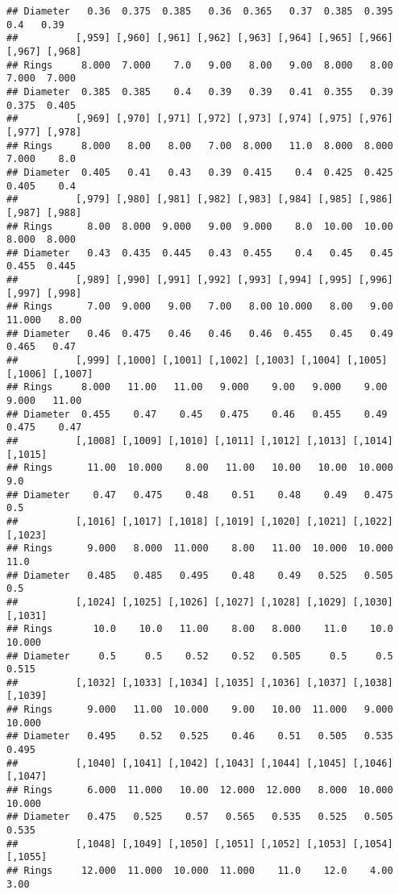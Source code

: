 \documentclass[
]{article}
\begin{document}
\begin{verbatim}
## Diameter   0.36  0.375  0.385   0.36  0.365   0.37  0.385  0.395    0.4   0.39
##          [,959] [,960] [,961] [,962] [,963] [,964] [,965] [,966] [,967] [,968]
## Rings     8.000  7.000    7.0   9.00   8.00   9.00  8.000   8.00  7.000  7.000
## Diameter  0.385  0.385    0.4   0.39   0.39   0.41  0.355   0.39  0.375  0.405
##          [,969] [,970] [,971] [,972] [,973] [,974] [,975] [,976] [,977] [,978]
## Rings     8.000   8.00   8.00   7.00  8.000   11.0  8.000  8.000  7.000    8.0
## Diameter  0.405   0.41   0.43   0.39  0.415    0.4  0.425  0.425  0.405    0.4
##          [,979] [,980] [,981] [,982] [,983] [,984] [,985] [,986] [,987] [,988]
## Rings      8.00  8.000  9.000   9.00  9.000    8.0  10.00  10.00  8.000  8.000
## Diameter   0.43  0.435  0.445   0.43  0.455    0.4   0.45   0.45  0.455  0.445
##          [,989] [,990] [,991] [,992] [,993] [,994] [,995] [,996] [,997] [,998]
## Rings      7.00  9.000   9.00   7.00   8.00 10.000   8.00   9.00 11.000   8.00
## Diameter   0.46  0.475   0.46   0.46   0.46  0.455   0.45   0.49  0.465   0.47
##          [,999] [,1000] [,1001] [,1002] [,1003] [,1004] [,1005] [,1006] [,1007]
## Rings     8.000   11.00   11.00   9.000    9.00   9.000    9.00   9.000   11.00
## Diameter  0.455    0.47    0.45   0.475    0.46   0.455    0.49   0.475    0.47
##          [,1008] [,1009] [,1010] [,1011] [,1012] [,1013] [,1014] [,1015]
## Rings      11.00  10.000    8.00   11.00   10.00   10.00  10.000     9.0
## Diameter    0.47   0.475    0.48    0.51    0.48    0.49   0.475     0.5
##          [,1016] [,1017] [,1018] [,1019] [,1020] [,1021] [,1022] [,1023]
## Rings      9.000   8.000  11.000    8.00   11.00  10.000  10.000    11.0
## Diameter   0.485   0.485   0.495    0.48    0.49   0.525   0.505     0.5
##          [,1024] [,1025] [,1026] [,1027] [,1028] [,1029] [,1030] [,1031]
## Rings       10.0    10.0   11.00    8.00   8.000    11.0    10.0  10.000
## Diameter     0.5     0.5    0.52    0.52   0.505     0.5     0.5   0.515
##          [,1032] [,1033] [,1034] [,1035] [,1036] [,1037] [,1038] [,1039]
## Rings      9.000   11.00  10.000    9.00   10.00  11.000   9.000  10.000
## Diameter   0.495    0.52   0.525    0.46    0.51   0.505   0.535   0.495
##          [,1040] [,1041] [,1042] [,1043] [,1044] [,1045] [,1046] [,1047]
## Rings      6.000  11.000   10.00  12.000  12.000   8.000  10.000  10.000
## Diameter   0.475   0.525    0.57   0.565   0.535   0.525   0.505   0.535
##          [,1048] [,1049] [,1050] [,1051] [,1052] [,1053] [,1054] [,1055]
## Rings     12.000  11.000  10.000  11.000    11.0    12.0    4.00    3.00

\end{verbatim}
\end{document}
